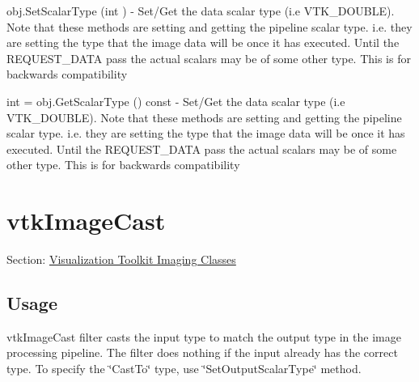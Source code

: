 \begin{DoxyItemize}
\item {\ttfamily obj.\-Set\-Scalar\-Type (int )} -\/ Set/\-Get the data scalar type (i.\-e V\-T\-K\-\_\-\-D\-O\-U\-B\-L\-E). Note that these methods are setting and getting the pipeline scalar type. i.\-e. they are setting the type that the image data will be once it has executed. Until the R\-E\-Q\-U\-E\-S\-T\-\_\-\-D\-A\-T\-A pass the actual scalars may be of some other type. This is for backwards compatibility  
\item {\ttfamily int = obj.\-Get\-Scalar\-Type () const} -\/ Set/\-Get the data scalar type (i.\-e V\-T\-K\-\_\-\-D\-O\-U\-B\-L\-E). Note that these methods are setting and getting the pipeline scalar type. i.\-e. they are setting the type that the image data will be once it has executed. Until the R\-E\-Q\-U\-E\-S\-T\-\_\-\-D\-A\-T\-A pass the actual scalars may be of some other type. This is for backwards compatibility  
\end{DoxyItemize}\hypertarget{vtkimaging_vtkimagecast}{}\section{vtk\-Image\-Cast}\label{vtkimaging_vtkimagecast}
Section\-: \hyperlink{sec_vtkimaging}{Visualization Toolkit Imaging Classes} \hypertarget{vtkwidgets_vtkxyplotwidget_Usage}{}\subsection{Usage}\label{vtkwidgets_vtkxyplotwidget_Usage}
vtk\-Image\-Cast filter casts the input type to match the output type in the image processing pipeline. The filter does nothing if the input already has the correct type. To specify the \char`\"{}\-Cast\-To\char`\"{} type, use \char`\"{}\-Set\-Output\-Scalar\-Type\char`\"{} method.

